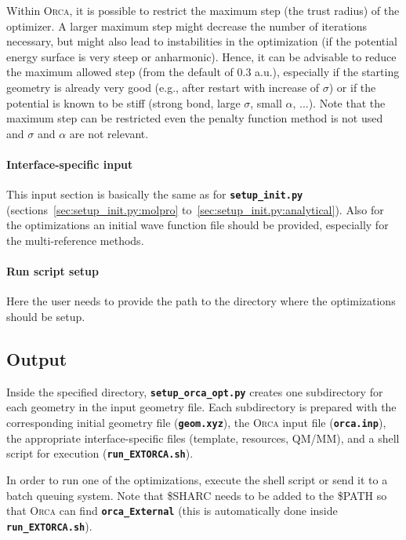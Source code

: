 \documentclass[a4paper,10pt,DIV=15,openany,twoside=false]{scrbook}
\newcommand{\todo}[1]{\textcolor{RL}{#1}}
\newcommand{\ttt}[1]{\textbf{\texttt{#1}}}
\begin{document}
Within \textsc{Orca}, it is possible to restrict the maximum step (the trust radius) of the optimizer. 
A larger maximum step might decrease the number of iterations necessary, but might also lead to instabilities in the optimization (if the potential energy surface is very steep or anharmonic).
Hence, it can be advisable to reduce the maximum allowed step (from the default of 0.3 a.u.), especially if the starting geometry is already very good (e.g., after restart with increase of $\sigma$) or if the potential is known to be stiff (strong bond, large $\sigma$, small $\alpha$, ...).
Note that the maximum step can be restricted even the penalty function method is not used and $\sigma$ and $\alpha$ are not relevant.

\paragraph{Interface-specific input}

This input section is basically the same as for \ttt{setup\_init.py} (\todo{sections~\ref{sec:setup_init.py:molpro} to~\ref{sec:setup_init.py:analytical}}). Also for the optimizations an initial wave function file should be provided, especially for the multi-reference methods.

\paragraph{Run script setup}

Here the user needs to provide the path to the directory where the optimizations should be setup.


\subsection{Output}

Inside the specified directory, \ttt{setup\_orca\_opt.py} creates one subdirectory for each geometry in the input geometry file.
Each subdirectory is prepared with the corresponding initial geometry file (\ttt{geom.xyz}), the \textsc{Orca} input file (\ttt{orca.inp}), the appropriate interface-specific files (template, resources, QM/MM), and a shell script for execution (\ttt{run\_EXTORCA.sh}).

In order to run one of the optimizations, execute the shell script or send it to a batch queuing system.
Note that \$SHARC needs to be added to the \$PATH so that \textsc{Orca} can find \ttt{orca\_External} (this is automatically done inside \ttt{run\_EXTORCA.sh}).
\end{document}
